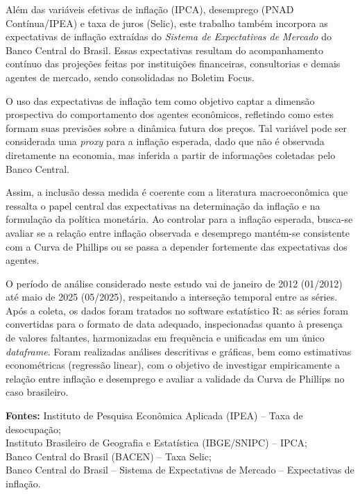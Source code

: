 \documentclass[12pt,oneside]{abntex2}
\begin{document}
Além das variáveis efetivas de inflação (IPCA), desemprego (PNAD Contínua/IPEA) e taxa de juros (Selic), este trabalho também incorpora as expectativas de inflação extraídas do \textit{Sistema de Expectativas de Mercado} do Banco Central do Brasil. Essas expectativas resultam do acompanhamento contínuo das projeções feitas por instituições financeiras, consultorias e demais agentes de mercado, sendo consolidadas no Boletim Focus.

O uso das expectativas de inflação tem como objetivo captar a dimensão prospectiva do comportamento dos agentes econômicos, refletindo como estes formam suas previsões sobre a dinâmica futura dos preços. Tal variável pode ser considerada uma \textit{proxy} para a inflação esperada, dado que não é observada diretamente na economia, mas inferida a partir de informações coletadas pelo Banco Central. 

Assim, a inclusão dessa medida é coerente com a literatura macroeconômica que ressalta o papel central das expectativas na determinação da inflação e na formulação da política monetária. Ao controlar para a inflação esperada, busca-se avaliar se a relação entre inflação observada e desemprego mantém-se consistente com a Curva de Phillips ou se passa a depender fortemente das expectativas dos agentes.

\medskip

O período de análise considerado neste estudo vai de janeiro de 2012 (01/2012) até maio de 2025 (05/2025), respeitando a interseção temporal entre as séries. Após a coleta, os dados foram tratados no software estatístico R: as séries foram convertidas para o formato de data adequado, inspecionadas quanto à presença de valores faltantes, harmonizadas em frequência e unificadas em um único \textit{dataframe}. Foram realizadas análises descritivas e gráficas, bem como estimativas econométricas (regressão linear), com o objetivo de investigar empiricamente a relação entre inflação e desemprego e avaliar a validade da Curva de Phillips no caso brasileiro.

\medskip
\noindent \textbf{Fontes:}  
Instituto de Pesquisa Econômica Aplicada (IPEA) – Taxa de desocupação; \\
Instituto Brasileiro de Geografia e Estatística (IBGE/SNIPC) – IPCA; \\
Banco Central do Brasil (BACEN) – Taxa Selic; \\
Banco Central do Brasil – Sistema de Expectativas de Mercado – Expectativas de inflação. \\
\end{document}
